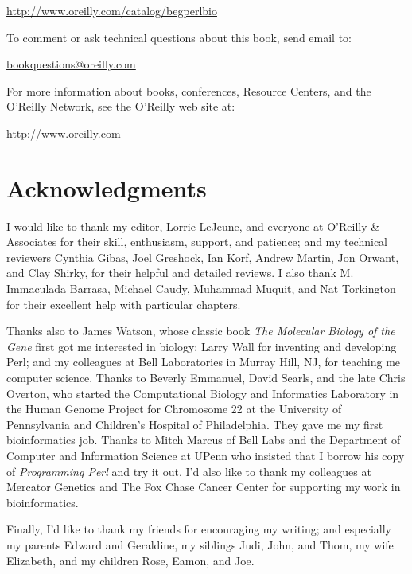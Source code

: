 \href{http://www.oreilly.com/catalog/begperlbio}{http://www.oreilly.com/catalog/begperlbio}

To comment or ask technical questions about this book, send email to:

\href{bookquestions@oreilly.com}{bookquestions@oreilly.com}

For more information about books, conferences, Resource Centers, and the O'Reilly Network, see the O'Reilly web site at:

\href{http://www.oreilly.com}{http://www.oreilly.com}

\section*{Acknowledgments}
I would like to thank my editor, Lorrie LeJeune, and everyone at O'Reilly \& Associates for their skill, enthusiasm, support, and patience; and my technical reviewers Cynthia Gibas, Joel Greshock, Ian Korf, Andrew Martin, Jon Orwant, and Clay Shirky, for their helpful and detailed reviews. I also thank M. Immaculada Barrasa, Michael Caudy, Muhammad Muquit, and Nat Torkington for their excellent help with particular chapters.

Thanks also to James Watson, whose classic book \textit{The Molecular Biology of the Gene} first got me interested in biology; Larry Wall for inventing and developing Perl; and my colleagues at Bell Laboratories in Murray Hill, NJ, for teaching me computer science. Thanks to Beverly Emmanuel, David Searls, and the late Chris Overton, who started the Computational Biology and Informatics Laboratory in the Human Genome Project for Chromosome 22 at the University of Pennsylvania and Children's Hospital of Philadelphia. They gave me my first bioinformatics job. Thanks to Mitch Marcus of Bell Labs and the Department of Computer and Information Science at UPenn who insisted that I borrow his copy of \textit{Programming Perl} and try it out. I'd also like to thank my colleagues at Mercator Genetics and The Fox Chase Cancer Center for supporting my work in bioinformatics.

Finally, I'd like to thank my friends for encouraging my writing; and especially my parents Edward and Geraldine, my siblings Judi, John, and Thom, my wife Elizabeth, and my children Rose, Eamon, and Joe.
